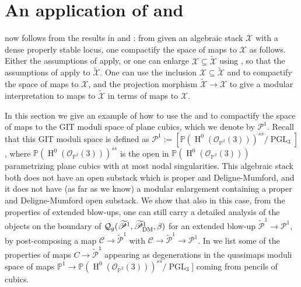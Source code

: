 \documentclass{amsart}
\newcommand{\bP}{\mathbb{P}}
\newcommand{\oH}{\operatorname{H}}
\newcommand{\sP}{\mathscr{P}}
\newcommand{\cC}{\mathcal{C}}
\newcommand{\cO}{\mathcal{O}}
\newcommand{\cQ}{\mathcal{Q}}
\newcommand{\cX}{\mathcal{X}}
\newcommand{\PGL}{\operatorname{PGL}}
\newcommand{\dm}{{\rm DM}}
\theoremstyle{definition}
\theoremstyle{definition}
\begin{document}
{\section{An application of  and  }\label{section_examples_extended}
 now follows from the results in  and : from  given an algebraic stack $\cX$ with a dense properly stable locus, one compactify the space of maps to $\cX$ as follows. Either the assumptions of  apply, or one can enlarge $\cX\subseteq \widetilde{\cX}$ using , so that the assumptions of  apply to $\widetilde{\cX}$. One can use the inclusion $\cX\subseteq \widetilde{\cX}$ and  to compactify the space of maps to $\cX$, and the projection morphism $\widetilde{\cX}\to \cX$ to give a modular interpretation to maps to $\widetilde{\cX}$ in terms of maps to $\cX$.

In this section we give an example of how to use the  and  to compactify the space of maps to the GIT moduli space of plane cubics, which we denote by $\sP^1$. Recall that this GIT moduli space is defined as $\sP^1:= [\bP(\oH^0(\cO_{\bP^2}(3)))^{ss}/\PGL_3]$, where $\bP(\oH^0(\cO_{\bP^2}(3)))^{ss}$ is the open in $\bP(\oH^0(\cO_{\bP^2}(3)))$ parametrizing plane cubics with at most nodal singularities. This algebraic stack both does not have an open substack which is proper and Deligne-Mumford, and it does not have (as far as we know) a modular enlargement containing a proper and Deligne-Mumford open substack.
We show that also in this case, from the properties of extended blow-ups, one can still carry a detailed analysis of the objects on the boundary of $\cQ_g(\widetilde{\sP}^1,\widetilde{\sP}^1_\dm,\beta)$ for an extended blow-up $\widetilde{\sP}^1\to \sP^1$, by post-composing a map $\cC\to\widetilde{\sP}^1$ with $\cC\to\widetilde{\sP}^1\to \sP^1$. In  we list some of the properties of maps $C\to \widetilde{\sP}^1$ appearing as degenerations in the quasimaps moduli space of maps $\bP^1\to \bP(\oH^0(\cO_{\bP^2}(3)))^{ss}/\PGL_3]$ coming from pencils of cubics.


}
\end{document}
